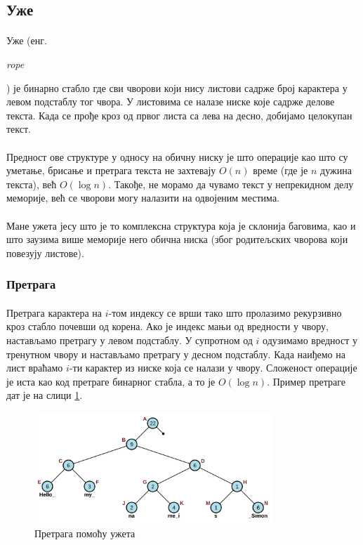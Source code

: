 \documentclass[12pt,oneside]{memoir}
\begin{document}
\subsection{Уже}
\paragraph{}
Уже (енг. \begin{latinica}\textit{rope}\end{latinica}) је бинарно стабло где сви чворови који нису
листови садрже број карактера у левом подстаблу тог чвора. У листовима се налазе ниске које 
садрже делове текста. Када се прође кроз од првог листа са лева на десно, добијамо целокупан
текст.

\paragraph{}
Предност ове структуре у односу на обичну ниску је што операције као што су уметање, брисање
и претрага текста не захтевају \(O(n)\) време (где је \(n\) дужина текста), већ \(O(\log{}n)\).
Такође, не морамо да чувамо текст у непрекидном делу меморије, већ се чворови могу налазити на
одвојеним местима.

\paragraph{}
Мане ужета јесу што је то комплексна структура која је склонија баговима, као и што заузима
више меморије него обична ниска (због родитељских чворова који повезују листове).

\subsubsection{Претрага}
\paragraph{}
Претрага карактера на \(i\)-том  индексу се врши тако што пролазимо рекурзивно кроз стабло 
почевши од корена. Ако је индекс мањи од вредности у чвору, настављамо претрагу у левом 
подстаблу. У супротном од \(i\) одузимамо вредност у тренутном чвору и настављамо претрагу у
десном подстаблу. Када наиђемо на лист враћамо \(i\)-ти карактер из ниске која се налази
у чвору. Сложеност операције је иста као код претраге бинарног стабла, а то је \(O(\log{}n)\).
Пример претраге дат је на слици \ref{fig:rope_search}.

\begin{figure}
  \centering
  \includegraphics[width=0.8\textwidth]{images/rope_search.png}
  \caption{Претрага помоћу ужета}
  \label{fig:rope_search}
\end{figure}
\end{document}
